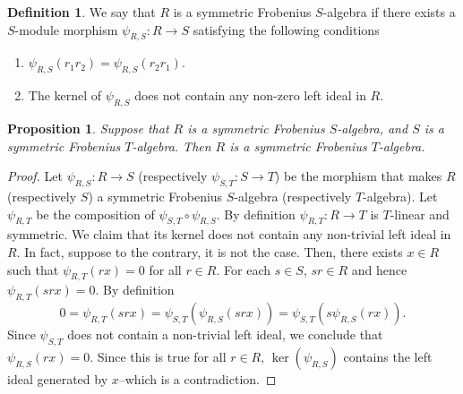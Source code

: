 \documentclass[12pt, a4paper]{amsart}
\newtheorem{prop}[thm]{Proposition}
\theoremstyle{definition}
\newtheorem{definition}[thm]{Definition}
\numberwithin{equation}{section}
\begin{document}
\begin{definition}
We say that $R$ is a symmetric Frobenius $S$-algebra if there exists a $S$-module morphism $\psi_{R,S}\colon R \to S$ satisfying the following conditions 
\begin{enumerate}
    \item $\psi_{R,S}(r_1r_2) =\psi_{R,S}(r_2 r_1)$. 
    \item The kernel of $\psi_{R,S}$ does not contain any non-zero left ideal in $R.$

\end{enumerate}
\end{definition}
\begin{prop} \label{prop:composition-frobenius}
Suppose that $R$ is a symmetric Frobenius $S$-algebra, and $S$ is a symmetric Frobenius $T$-algebra. Then $R$ is a symmetric Frobenius $T$-algebra. 
\end{prop}
\begin{proof}
    Let $\psi_{R,S}\colon R \to S$ (respectively $\psi_{S, T}\colon S \to T$) be the morphism that makes $R$ (respectively $S$) a symmetric Frobenius $S$-algebra (respectively $T$-algebra). Let $\psi_{R, T}$ be the composition of $\psi_{S,T} \circ \psi_{R,S}.$ By definition $\psi_{R,T}\colon R \to T$ is $T$-linear and symmetric. We claim that its kernel does not contain any non-trivial left ideal in $R.$ In fact, suppose to the contrary, it is not the case. Then, there exists $x \in R$ such that $\psi_{R,T}(rx)=0$ for all $r\in R.$ For each $s \in S$, $sr \in R$ and hence $\psi_{R,T}(srx)=0.$ By definition 
    \[ 0 = \psi_{R,T}(srx) = \psi_{S, T} (\psi_{R,S}(srx)) = \psi_{S,T}(s \psi_{R,S}(rx)) . \]
    Since $\psi_{S,T}$ does not contain a non-trivial left ideal, we conclude that $\psi_{R,S}(rx)=0.$ Since this is true for all $r \in R$, $\ker(\psi_{R,S})$ contains the left ideal generated by $x$--which is a contradiction. 
\end{proof}
\end{document}
